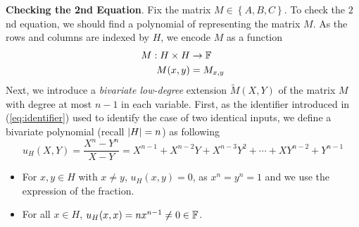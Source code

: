 \documentclass{article}
\begin{document}
\textbf{Checking the 2nd Equation}. Fix the matrix $M \in \left\{ A, B, C \right\}$. To check the $2$nd equation, we should find a polynomial of representing the matrix $M$. As the rows and columns are indexed by $H$, we encode $M$ as a function 
\begin{equation*}
\begin{split}
M: H \times H & \rightarrow \mathbb{F} \\
M(x, y) & = M_{x, y}
\end{split}
\end{equation*}
Next, we introduce a \textit{bivariate low-degree} extension $\widetilde{M}(X, Y)$ of the matrix $M$ with degree at most $n - 1$ in each variable. First, as the identifier introduced in (\ref{eq:identifier}) used to identify the case of two identical inputs, we define a bivariate polynomial (recall $\abs{H} = n$) as following
\begin{equation*}
u_H(X, Y) = \frac{X^n - Y^n}{X - Y} = X^{n-1} + X^{n-2}Y + X^{n-3}Y^2 + \cdots + XY^{n-2} + Y^{n-1}
\end{equation*}
\begin{itemize}
\item For $x, y \in H$ with $x \neq y$, $u_H(x, y) = 0$, as $x^n = y^n = 1$ and we use the expression of the fraction.
\item For all $x \in H$, $u_H(x, x) = nx^{n-1} \neq 0 \in \mathbb{F}$.
\end{itemize}
\end{document}
